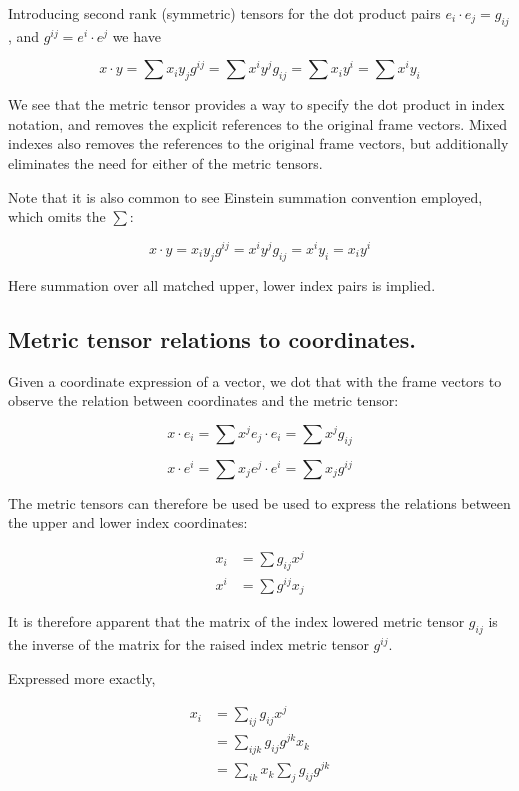 Introducing second rank (symmetric) tensors for the dot product pairs $ e_i \cdot e_j = g_{ij}$, and $ g^{ij} = e^i \cdot e^j $ we have

\[
x \cdot y = \sum x_i y_j g^{ij} = \sum x^i y^j g_{ij} = \sum x_i y^i = \sum x^i y_i
\]

We see that the metric tensor provides a way to specify the dot product in index notation, and removes the explicit references to the original frame vectors.  Mixed indexes also removes the references to the original frame vectors, but additionally eliminates the need for either of the metric tensors.

Note that it is also common to see Einstein summation convention employed, which omits the $\sum$:

\[
x \cdot y = x_i y_j g^{ij} = x^i y^j g_{ij} = x^i y_i = x_i y^i
\]

Here summation over all matched upper, lower index pairs is implied.

\subsection{Metric tensor relations to coordinates. }

Given a coordinate expression of a vector, we dot that with the frame vectors to observe the relation between coordinates and the metric tensor:

\[
x \cdot e_i = \sum x^j e_j \cdot e_i = \sum x^j g_{ij}
\]

\[
x \cdot e^i = \sum x_j e^j \cdot e^i = \sum x_j g^{ij}
\]

The metric tensors can therefore be used be used to express the relations between the upper and lower index coordinates:

\begin{align}
x_i &= \sum g_{ij} x^j \label{eqn:metric_upper_to_lower} \\
x^i &= \sum g^{ij} x_j \label{eqn:metric_lower_to_upper}
\end{align}

It is therefore apparent that the matrix of the index lowered metric tensor $g_{ij}$ is the inverse of the matrix for the raised index metric tensor $g^{ij}$.

Expressed more exactly, 

\begin{align*}
x_i
&= \sum_{ij} g_{ij} x^j \\
&= \sum_{ijk} g_{ij} g^{jk} x_k \\
&= \sum_{ik} x_k \sum_j g_{ij} g^{jk} \\
\end{align*}

